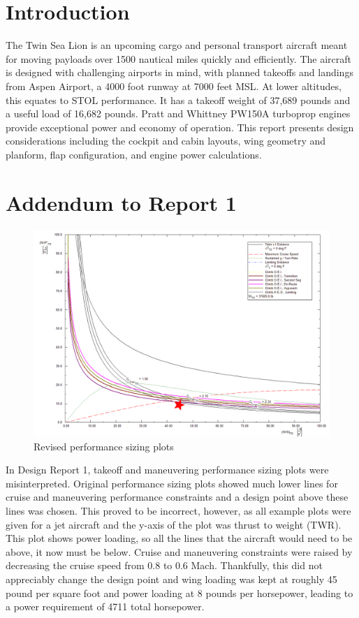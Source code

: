 \documentclass[conf]{new-aiaa}
\begin{document}
\section{Introduction}
The Twin Sea Lion is an upcoming cargo and personal transport aircraft meant for moving payloads over 1500 nautical miles quickly and efficiently. The aircraft is designed with challenging airports in mind, with planned takeoffs and landings from Aspen Airport, a 4000 foot runway at 7000 feet MSL. At lower altitudes, this equates to STOL performance. It has a takeoff weight of 37,689 pounds and a useful load of 16,682 pounds. Pratt and Whittney PW150A turboprop engines provide exceptional power and economy of operation. This report presents design considerations including the cockpit and cabin layouts, wing geometry and planform, flap configuration, and engine power calculations.

\section{Addendum to Report 1}

\begin{figure}[H]
    \includegraphics[width=\textwidth]{plots/new_perf_sizing_annotated}
    \caption{Revised performance sizing plots}
    \label{fig:new_perf_sizing}
\end{figure}

In Design Report 1, takeoff and maneuvering performance sizing plots were misinterpreted. Original 
performance sizing plots showed much lower lines for cruise and maneuvering performance constraints 
and a design point above these lines was chosen. This proved to be incorrect, however, as all example plots were given for a jet aircraft and the y-axis of the plot was thrust to weight (TWR). This plot shows power loading, so all the lines that the aircraft would need to be above, it now must be below. Cruise and maneuvering constraints were raised by decreasing the cruise speed from 0.8 to 0.6 Mach. Thankfully, this did not appreciably change the design point and wing loading was kept at roughly 45 pound per square foot and power loading at 8 pounds per horsepower, leading to a power requirement of 4711 total horsepower.
\end{document}
